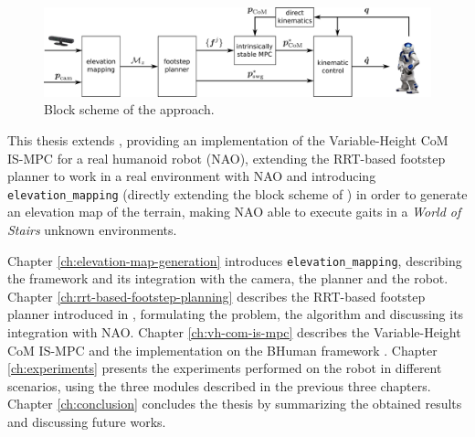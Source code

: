 \begin{figure}
  \centering
  \includegraphics[width=\textwidth]{figures/BlockScheme.pdf}
  \caption{Block scheme of the approach.}
  \label{fig:block-scheme}
\end{figure}

This thesis extends \cite{ECC19}, providing an implementation of the
Variable-Height CoM IS-MPC for a real humanoid robot (NAO), extending the 
RRT-based footstep planner to work in a real environment with NAO and 
introducing \texttt{elevation\_mapping} (directly extending the block scheme
of \cite{ECC19}) in order to generate an elevation map of the terrain,
making NAO able to execute gaits in a \textit{World of Stairs} unknown
environments.

Chapter \ref{ch:elevation-map-generation} introduces
\texttt{elevation\_mapping}, describing the framework and its integration with
the camera, the planner and the robot. Chapter
\ref{ch:rrt-based-footstep-planning} describes the RRT-based footstep planner
introduced in \cite{ECC19}, formulating the problem, the algorithm and
discussing its integration with NAO. Chapter \ref{ch:vh-com-is-mpc} describes
the Variable-Height CoM IS-MPC and the implementation on the BHuman framework
\cite{BHumanCodeRelease2018}. Chapter \ref{ch:experiments} presents the
experiments performed on the robot in different scenarios, using the three
modules described in the previous three chapters. Chapter \ref{ch:conclusion}
concludes the thesis by summarizing the obtained results and discussing
future works.

